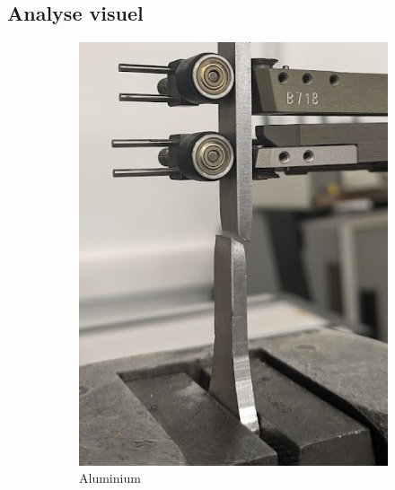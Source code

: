 \subsection{Analyse visuel}
\begin{figure}[!htb]
    \centering
    \begin{subfigure}[t]{.32\textwidth}
        \includegraphics[width=\textwidth]{../ressources/images/aluminium_rupture}
        \caption{Aluminium}
        \label{rupture_aluminium}
    \end{subfigure}
    \begin{subfigure}[t]{.33\textwidth}

\end{subfigure}
\end{figure}
